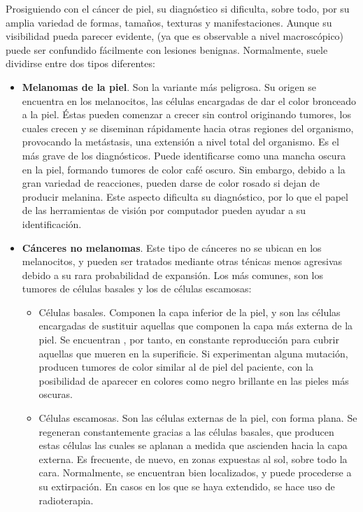 Prosiguiendo con el cáncer de piel, su diagnóstico si dificulta, sobre todo, por su amplia variedad de formas, tamaños, texturas y manifestaciones. Aunque su visibilidad pueda parecer evidente, (ya que es observable a nivel macroscópico) puede ser confundido fácilmente con lesiones benignas. Normalmente, suele dividirse entre dos tipos diferentes:
\begin{itemize}
	\item \textbf{Melanomas de la piel}. Son la variante más peligrosa. Su origen se encuentra en los melanocitos, las células encargadas de dar el color bronceado a la piel.  Éstas pueden comenzar a crecer sin control originando tumores, los cuales crecen y se diseminan rápidamente hacia otras regiones del organismo, provocando la metástasis, una extensión a nivel total del organismo. Es el más grave de los diagnósticos. Puede identificarse como una mancha oscura en la piel, formando tumores de color café oscuro. Sin embargo, debido a la gran variedad de reacciones, pueden darse de color rosado si dejan de producir melanina. Este aspecto dificulta su diagnóstico, por lo que el papel de las herramientas de visión por computador pueden ayudar a su identificación.
	\item \textbf{Cánceres no melanomas}. Este tipo de cánceres no se ubican en los melanocitos, y pueden ser tratados mediante otras ténicas menos agresivas debido a su rara probabilidad de expansión. Los más comunes, son los tumores de células basales y los de células escamosas:
	\begin{itemize}
		\item Células basales. Componen la capa inferior de la piel, y son las células encargadas de sustituir aquellas que componen la capa más externa de la piel. Se encuentran , por tanto, en constante reproducción para cubrir aquellas que mueren en la superificie. Si experimentan alguna mutación, producen tumores de color similar al de piel del paciente, con la posibilidad de aparecer en colores como negro brillante en las pieles más oscuras.
		
		\item Células escamosas. Son las células externas de la piel, con forma plana. Se regeneran constantemente gracias a las células basales, que producen estas células las cuales se aplanan a medida que ascienden hacia la capa externa. Es frecuente, de nuevo, en zonas expuestas al sol, sobre todo la cara. Normalmente, se encuentran bien localizados, y puede procederse a su extirpación. En casos en los que se haya extendido, se hace uso de radioterapia.
		
	\end{itemize}
\end{itemize}


